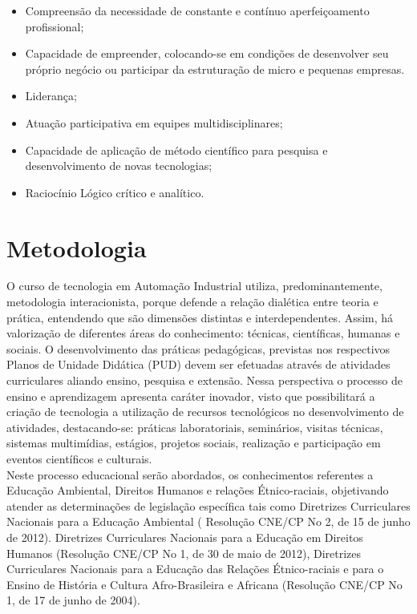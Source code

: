 \begin{itemize}
\item Compreensão da necessidade de constante e contínuo aperfeiçoamento profissional;

\item Capacidade de empreender, colocando-se em condições de desenvolver seu próprio negócio ou participar da estruturação de micro e pequenas empresas.

\item Liderança;

\item Atuação participativa em equipes multidisciplinares;

\item Capacidade de aplicação de método científico para pesquisa e desenvolvimento de novas tecnologias;

\item Raciocínio Lógico crítico e analítico.

\end{itemize}

\chapter{Metodologia}

O curso de tecnologia em Automação Industrial utiliza, predominantemente, metodologia interacionista, porque defende a relação dialética entre teoria e prática, entendendo que são dimensões distintas e interdependentes. Assim, há valorização de diferentes áreas do conhecimento: técnicas, científicas, humanas e sociais. O desenvolvimento das práticas pedagógicas, previstas nos respectivos Planos de Unidade Didática (PUD) devem ser efetuadas através de atividades curriculares aliando ensino, pesquisa e extensão. Nessa perspectiva o processo de ensino e aprendizagem apresenta caráter inovador, visto que possibilitará a criação de tecnologia a utilização de recursos tecnológicos no desenvolvimento de  atividades, destacando-se: práticas laboratoriais, seminários, visitas técnicas, sistemas multimídias, estágios, projetos sociais, realização e participação em eventos científicos e culturais.\\

Neste processo educacional serão abordados, os conhecimentos referentes a Educação Ambiental, Direitos Humanos e relações Étnico-raciais, objetivando atender as determinações de legislação específica tais como Diretrizes Curriculares Nacionais para a Educação Ambiental ( Resolução CNE/CP No 2, de 15 de junho de 2012). Diretrizes Curriculares Nacionais para a Educação em Direitos Humanos (Resolução CNE/CP No 1, de 30 de maio de 2012), Diretrizes Curriculares Nacionais para a Educação das Relações Étnico-raciais e para o Ensino de História e Cultura Afro-Brasileira e Africana (Resolução CNE/CP No 1, de 17 de junho de 2004).\\

